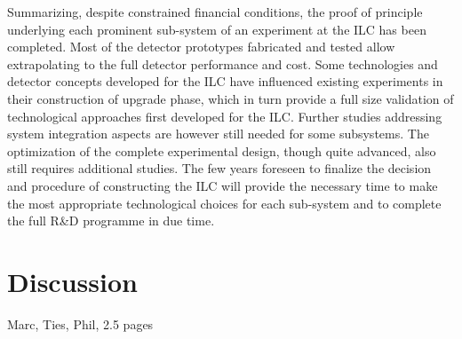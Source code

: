 \documentclass[%
 reprint,
 amsmath,amssymb,
 aps,
]{revtex4-1}
\begin{document}
Summarizing, despite constrained ﬁnancial conditions, the proof of principle underlying each prominent sub-system of an experiment at the ILC has been completed. Most of the detector prototypes fabricated and tested allow extrapolating to the full detector performance and cost. Some technologies and detector concepts developed for the ILC have influenced existing experiments in their construction of upgrade phase, which in turn provide a full size validation of technological approaches ﬁrst developed for the ILC. Further studies addressing system integration aspects are however still needed for some subsystems. The optimization of the complete experimental design, though quite advanced, also still requires additional studies. The few years foreseen to finalize the decision and procedure of constructing the ILC will provide the necessary time to make the most appropriate technological choices for each sub-system and to complete the full R\&D programme in due time.

\section{\label{sec:discussion}Discussion}

Marc, Ties, Phil, 2.5 pages
\end{document}
